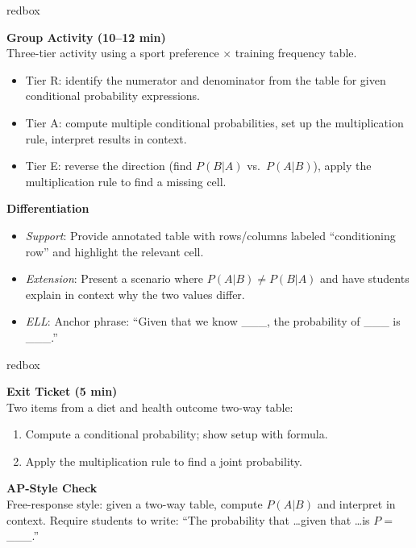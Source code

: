 \documentclass[10pt]{article}
\begin{document}
\begin{skillbox}{redbox}
\begin{minipage}[t]{0.48\linewidth}
    \textbf{Group Activity (10--12 min)}\\
    Three-tier activity using a sport preference $\times$ training frequency table.
    \begin{itemize}
        \item Tier R: identify the numerator and denominator from the table for given
              conditional probability expressions.
        \item Tier A: compute multiple conditional probabilities, set up the
              multiplication rule, interpret results in context.
        \item Tier E: reverse the direction (find $P(B|A)$ vs.\ $P(A|B)$), apply
              the multiplication rule to find a missing cell.
    \end{itemize}
\end{minipage}
\hfill
\begin{minipage}[t]{0.48\linewidth}
    \textbf{Differentiation}
    \begin{itemize}
        \item \textit{Support}: Provide annotated table with rows/columns labeled
              ``conditioning row'' and highlight the relevant cell.
        \item \textit{Extension}: Present a scenario where $P(A|B) \neq P(B|A)$
              and have students explain in context why the two values differ.
        \item \textit{ELL}: Anchor phrase: ``Given that we know \_\_\_, the probability
              of \_\_\_ is \_\_\_.''
    \end{itemize}
\end{minipage}
\end{skillbox}

\begin{skillbox}{redbox}
\begin{minipage}[t]{0.48\linewidth}
    \textbf{Exit Ticket (5 min)}\\
    Two items from a diet and health outcome two-way table:
    \begin{enumerate}
        \item Compute a conditional probability; show setup with formula.
        \item Apply the multiplication rule to find a joint probability.
    \end{enumerate}
\end{minipage}
\hfill
\begin{minipage}[t]{0.48\linewidth}
    \textbf{AP-Style Check}\\
    Free-response style: given a two-way table, compute $P(A|B)$ and interpret in
    context. Require students to write: ``The probability that \ldots given that
    \ldots is $P = $ \_\_\_.''
\end{minipage}
\end{skillbox}
\end{document}
